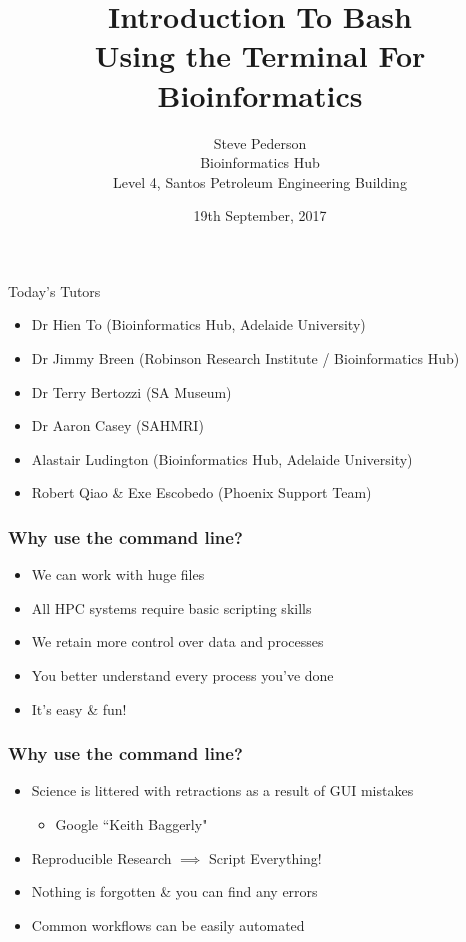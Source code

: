 \documentclass[11pt]{beamer}
\author{Steve Pederson\\
Bioinformatics Hub\\
Level 4, Santos Petroleum Engineering Building}
\title{Introduction To Bash \\
Using the Terminal For Bioinformatics}
\institute{University of Adelaide}
\date{19th September, 2017}
\let\oldframetitle\frametitle%
\renewcommand{\frametitle}[1]{%
  \oldframetitle{#1}\setstretch{2}}
\begin{document}
\begin{frame}
\titlepage
\end{frame}

\begin{frame}{Today's Tutors}
\begin{itemize}
\small
	\item Dr Hien To (Bioinformatics Hub, Adelaide University)
	\item Dr Jimmy Breen (Robinson Research Institute / Bioinformatics Hub)
	\item Dr Terry Bertozzi (SA Museum)
	\item Dr Aaron Casey (SAHMRI)
	\item Alastair Ludington (Bioinformatics Hub, Adelaide University)
	\item Robert Qiao \& Exe Escobedo (Phoenix Support Team)
\end{itemize}
\end{frame}

\begin{frame}
	\frametitle{Why use the command line?}
	\begin{itemize}
		\item We can work with huge files
		\item All HPC systems require basic scripting skills
		\item We retain more control over data and processes
		\item You better understand every process you've done
		\item It's easy \& fun!
	\end{itemize}
\end{frame}

\begin{frame}
\frametitle{Why use the command line?}
\begin{itemize}
	\item Science is littered with retractions as a result of GUI mistakes
	\begin{itemize}
		\item Google ``Keith Baggerly"
	\end{itemize}
	\item Reproducible Research $\implies$ Script Everything!
	\item Nothing is forgotten \& you can find any errors
	\item Common workflows can be easily automated
\end{itemize}
\end{frame}
\end{document}
